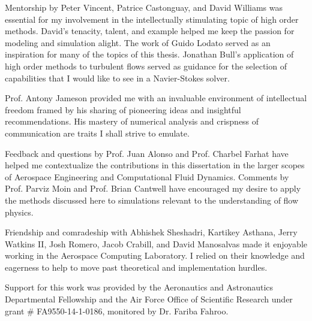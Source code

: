 
Mentorship by Peter Vincent, Patrice Castonguay, and David Williams was essential for my involvement in the intellectually stimulating topic of high order methods. David's tenacity, talent, and example helped me keep the passion for modeling and simulation alight. The work of Guido Lodato served as an inspiration for many of the topics of this thesis. Jonathan Bull's application of high order methods to turbulent flows served as guidance for the selection of capabilities that I would like to see in a Navier-Stokes solver.

Prof. Antony Jameson provided me with an invaluable environment of intellectual freedom framed by his sharing of pioneering ideas and insightful recommendations. His mastery of numerical analysis and crispness of communication are traits I shall strive to emulate.

Feedback and questions by Prof. Juan Alonso and Prof. Charbel Farhat have helped me contextualize the contributions in this dissertation in the larger scopes of Aerospace Engineering and Computational Fluid Dynamics. Comments by Prof. Parviz Moin and Prof. Brian Cantwell have encouraged my desire to apply the methods discussed here to simulations relevant to the understanding of flow physics.

Friendship and comradeship with Abhishek Sheshadri, Kartikey Asthana, Jerry Watkins II, Josh Romero, Jacob Crabill, and David Manosalvas made it enjoyable working in the Aerospace Computing Laboratory. I relied on their knowledge and eagerness to help to move past theoretical and implementation hurdles.

Support for this work was provided by the Aeronautics and Astronautics Departmental Fellowship and the Air Force Office of Scientific Research under grant \# FA9550-14-1-0186, monitored by Dr. Fariba Fahroo.
